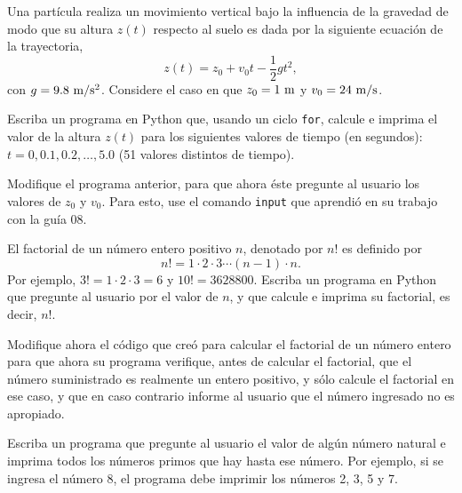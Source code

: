 \documentclass[11pt]{exam}
\begin{document}
\begin{questions}
\item Una partícula realiza un movimiento vertical bajo la influencia de la gravedad de modo que su altura $z(t)$ respecto al suelo es dada por la siguiente ecuación de la trayectoria,
\begin{equation}
z(t)=z_0 + v_0 t -\frac{1}{2}gt^2,
\end{equation}
con $g=9.8 {\ \rm m/s^2}$. Considere el caso en que $z_0=1 {\ \rm m}$ y $v_0=24 {\ \rm m/s}$.

Escriba un programa en Python que, usando un ciclo \texttt{for}, calcule e imprima el valor de la altura $z(t)$ para los siguientes valores de tiempo (en segundos): $t=0, 0.1, 0.2, \dots, 5.0$ (51 valores distintos de tiempo).

\item Modifique el programa anterior, para que ahora éste pregunte al usuario los valores de $z_0$ y $v_0$. Para esto, use el comando \texttt{input} que aprendió en su trabajo con la guía 08.


\item El factorial de un número entero positivo $n$, denotado por $n!$ es definido por
\begin{equation}
n!=1\cdot 2\cdot 3\cdots (n-1)\cdot n.
\end{equation}
Por ejemplo, $3!=1\cdot 2\cdot 3=6$ y $10!=3628800$.
Escriba un programa en Python que pregunte al usuario por el valor de $n$, y que calcule e imprima su factorial, es decir, $n!$.

\item Modifique ahora el código que creó para calcular el factorial de un número entero para que ahora su programa verifique, antes de calcular el factorial, que el número suministrado es realmente un entero positivo, y sólo calcule el factorial en ese caso, y que en caso contrario informe al usuario que el número ingresado no es apropiado.

\item Escriba un programa que pregunte al usuario el valor de algún número natural e imprima todos los números primos que hay hasta ese número. Por ejemplo, si se ingresa el número 8, el programa debe imprimir los números 2, 3, 5 y 7.


\end{questions}
\end{document}
